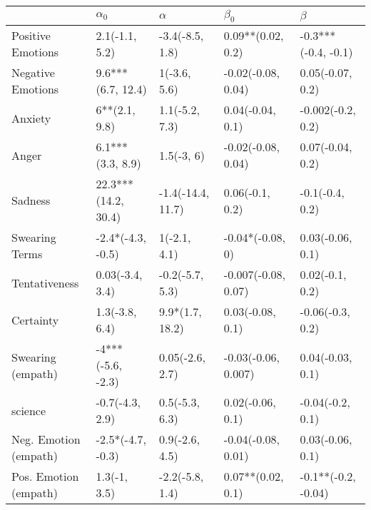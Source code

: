 \begin{tabular}{lllll}
\toprule
{} &           $\alpha_0$ &           $\alpha$ &            $\beta_0$ &              $\beta$ \\
\midrule
Positive Emotions     &       2.1(-1.1, 5.2) &    -3.4(-8.5, 1.8) &    0.09**(0.02, 0.2) &  -0.3***(-0.4, -0.1) \\
Negative Emotions     &    9.6***(6.7, 12.4) &       1(-3.6, 5.6) &   -0.02(-0.08, 0.04) &     0.05(-0.07, 0.2) \\
Anxiety               &        6**(2.1, 9.8) &     1.1(-5.2, 7.3) &     0.04(-0.04, 0.1) &    -0.002(-0.2, 0.2) \\
Anger                 &     6.1***(3.3, 8.9) &         1.5(-3, 6) &   -0.02(-0.08, 0.04) &     0.07(-0.04, 0.2) \\
Sadness               &  22.3***(14.2, 30.4) &  -1.4(-14.4, 11.7) &      0.06(-0.1, 0.2) &      -0.1(-0.4, 0.2) \\
Swearing Terms        &    -2.4*(-4.3, -0.5) &       1(-2.1, 4.1) &     -0.04*(-0.08, 0) &     0.03(-0.06, 0.1) \\
Tentativeness         &      0.03(-3.4, 3.4) &    -0.2(-5.7, 5.3) &  -0.007(-0.08, 0.07) &      0.02(-0.1, 0.2) \\
Certainty             &       1.3(-3.8, 6.4) &    9.9*(1.7, 18.2) &     0.03(-0.08, 0.1) &     -0.06(-0.3, 0.2) \\
Swearing (empath)     &    -4***(-5.6, -2.3) &    0.05(-2.6, 2.7) &  -0.03(-0.06, 0.007) &     0.04(-0.03, 0.1) \\
science               &      -0.7(-4.3, 2.9) &     0.5(-5.3, 6.3) &     0.02(-0.06, 0.1) &     -0.04(-0.2, 0.1) \\
Neg. Emotion (empath) &    -2.5*(-4.7, -0.3) &     0.9(-2.6, 4.5) &   -0.04(-0.08, 0.01) &     0.03(-0.06, 0.1) \\
Pos. Emotion (empath) &         1.3(-1, 3.5) &    -2.2(-5.8, 1.4) &    0.07**(0.02, 0.1) &  -0.1**(-0.2, -0.04) \\
\bottomrule
\end{tabular}
